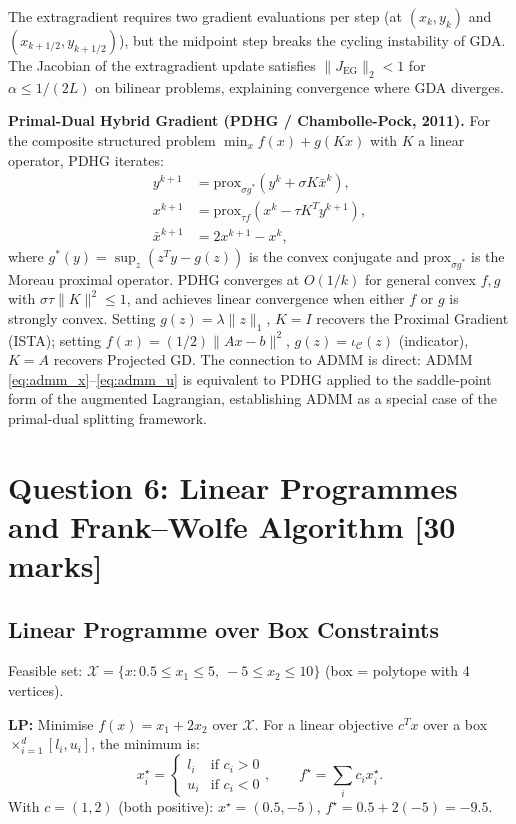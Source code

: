 \documentclass[11pt,a4paper]{article}
\theoremstyle{definition}
\begin{document}
The extragradient requires two gradient evaluations per step (at $(x_k, y_k)$ and $(x_{k+1/2}, y_{k+1/2})$), but the midpoint step breaks the cycling instability of GDA. The Jacobian of the extragradient update satisfies $\|J_{\text{EG}}\|_2 < 1$ for $\alpha \leq 1/(2L)$ on bilinear problems, explaining convergence where GDA diverges.

\noindent\textbf{Primal-Dual Hybrid Gradient (PDHG / Chambolle-Pock, 2011).} For the composite structured problem $\min_x f(x) + g(Kx)$ with $K$ a linear operator, PDHG iterates:
\begin{align}
y^{k+1} &= \text{prox}_{\sigma g^*}\!\left(y^k + \sigma K \bar{x}^k\right), \label{eq:pdhg_y}\\
x^{k+1} &= \text{prox}_{\tau f}\!\left(x^k - \tau K^T y^{k+1}\right), \label{eq:pdhg_x}\\
\bar{x}^{k+1} &= 2x^{k+1} - x^k, \label{eq:pdhg_xbar}
\end{align}
where $g^*(y) = \sup_z (z^T y - g(z))$ is the convex conjugate and $\text{prox}_{\sigma g^*}$ is the Moreau proximal operator. PDHG converges at $O(1/k)$ for general convex $f, g$ with $\sigma\tau\|K\|^2 \leq 1$, and achieves linear convergence when either $f$ or $g$ is strongly convex. Setting $g(z) = \lambda\|z\|_1$, $K = I$ recovers the Proximal Gradient (ISTA); setting $f(x) = (1/2)\|Ax-b\|^2$, $g(z) = \iota_{\mathcal{C}}(z)$ (indicator), $K = A$ recovers Projected GD. The connection to ADMM is direct: ADMM \eqref{eq:admm_x}--\eqref{eq:admm_u} is equivalent to PDHG applied to the saddle-point form of the augmented Lagrangian, establishing ADMM as a special case of the primal-dual splitting framework.

\section{Question 6: Linear Programmes and Frank--Wolfe Algorithm \hfill [30 marks]}
\label{sec:q6}

\subsection{Linear Programme over Box Constraints}

Feasible set: $\mathcal{X} = \{x : 0.5 \leq x_1 \leq 5,\ -5 \leq x_2 \leq 10\}$ (box = polytope with 4 vertices).

\textbf{LP:} Minimise $f(x) = x_1 + 2x_2$ over $\mathcal{X}$. For a linear objective $c^Tx$ over a box $\times_{i=1}^d [l_i, u_i]$, the minimum is:
\begin{equation}
x_i^{\star} = \begin{cases} l_i & \text{if } c_i > 0 \\ u_i & \text{if } c_i < 0 \end{cases}, \qquad f^{\star} = \sum_i c_i x_i^{\star}.
\end{equation}
With $c = (1, 2)$ (both positive): $x^{\star} = (0.5, -5)$, $f^{\star} = 0.5 + 2(-5) = -9.5$.
\end{document}
